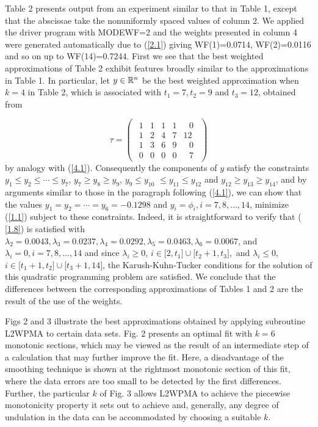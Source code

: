 \documentclass[acmtoms]{acmtrans2m}
\begin{document}
Table 2 presents output from an experiment similar to that in Table 1,
except that the abscissae take the nonuniformly spaced values of column 2.
We applied the driver program with MODEWF=2 and the weights presented in
column 4 were generated automatically due to (\ref{2.1}) giving
WF(1)=0.0714, WF(2)=0.0116 and so on up to WF(14)=0.7244. First we see that
the best weighted approximations of Table 2 exhibit features broadly similar
to the approximations in Table 1. In particular, let $y\in \Bbb{R}^{n}$ be
the best weighted approximation when $k=4$ in Table 2, which is associated
with $t_{1}=7,t_{2}=9$ and $t_{3}=12$, obtained from

\begin{equation}
\tau =\left( 
\begin{array}{r}
\begin{array}{lllll}
1 & 1 & 1 & 1 & \text{ }0 \\ 
1 & 2 & 4 & 7 & 12 \\ 
1 & 3 & 6 & 9 & \text{ }0 \\ 
0 & 0 & 0 & 0 & \text{ }7
\end{array}
\end{array}
\right)  \label{4.2}
\end{equation}
by analogy with (\ref{4.1}). Consequently the components of $y$ satisfy the
constraints $y_{1}\leq y_{2}\leq \cdots \leq y_{7}$, $y_{7}\geq y_{8}\geq
y_{9}$, $y_{9}\leq y_{10}$ $\leq y_{11}\leq y_{12}$ and $y_{12}\geq
y_{13}\geq y_{14}$, and by arguments similar to those in the paragraph
following (\ref{4.1}), we can show that the values $y_{1}=y_{2}=\cdots
=y_{6}=-0.1298$ and $y_{i}=\phi _{i},i=7,8,\ldots ,14$, minimize (\ref{1.1})
subject to these constraints. Indeed, it is straightforward to verify that (%
\ref{1.8}) is satisfied with $\lambda _{2}=0.0043,\lambda
_{3}=0.0237,\lambda _{4}=0.0292,\lambda _{5}=0.0463,\lambda _{6}=0.0067$,
and $\lambda _{i}=0,i=7,8,\ldots ,14$ and since $\lambda _{i}\geq 0$, $i\in
\lbrack 2,t_{1}]\cup \lbrack t_{2}+1,t_{3}],$ and $\lambda _{i}\leq 0$, $%
i\in \lbrack t_{1}+1,t_{2}]\cup \lbrack t_{3}+1,14]$, the Karush-Kuhn-Tucker
conditions for the solution of this quadratic programming problem are
satisfied. We conclude that the differences between the corresponding
approximations of Tables 1 and 2 are the result of the use of the weights.

Figs 2 and 3 illustrate the best approximations obtained by applying
subroutine L2WPMA to certain data sets. Fig. 2 presents an optimal fit with $%
k=6$ monotonic sections, which may be viewed as the result of an
intermediate step of a calculation that may further improve the fit. Here, a
disadvantage of the smoothing technique is shown at the rightmost monotonic
section of this fit, where the data errors are too small to be detected by
the first differences. Further, the particular $k$ of Fig. 3 allows L2WPMA
to achieve the piecewise monotonicity property it sets out to achieve and,
generally, any degree of undulation in the data can be accommodated by
choosing a suitable $k$.
\end{document}
